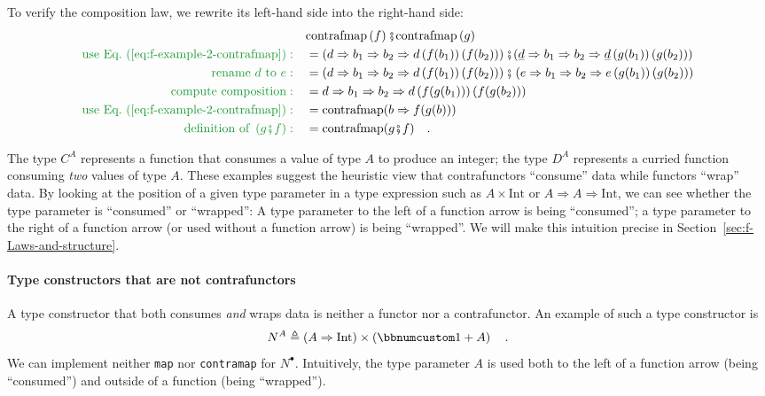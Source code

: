 To verify the composition law, we rewrite its left-hand side into
the right-hand side:
\begin{align*}
 & \text{contrafmap}\left(f\right)\bef\text{contrafmap}\left(g\right)\\
{\color{greenunder}\text{use Eq.~(\ref{eq:f-example-2-contrafmap})}:}\quad & =\left(d\Rightarrow b_{1}\Rightarrow b_{2}\Rightarrow d\left(f(b_{1})\right)\left(f(b_{2})\right)\right)\bef(\gunderline d\Rightarrow b_{1}\Rightarrow b_{2}\Rightarrow\gunderline d\left(g(b_{1})\right)\left(g(b_{2})\right))\\
{\color{greenunder}\text{rename }d\text{ to }e:}\quad & =\left(d\Rightarrow b_{1}\Rightarrow b_{2}\Rightarrow d\left(f(b_{1})\right)\left(f(b_{2})\right)\right)\bef\left(e\Rightarrow b_{1}\Rightarrow b_{2}\Rightarrow e\left(g(b_{1})\right)\left(g(b_{2})\right)\right)\\
{\color{greenunder}\text{compute composition}:}\quad & =d\Rightarrow b_{1}\Rightarrow b_{2}\Rightarrow d\left(f(g(b_{1}))\right)\left(f(g(b_{2}))\right)\\
{\color{greenunder}\text{use Eq.~(\ref{eq:f-example-2-contrafmap})}:}\quad & =\text{contrafmap}(b\Rightarrow f(g(b)))\\
{\color{greenunder}\text{definition of }\left(g\bef f\right):}\quad & =\text{contrafmap}(g\bef f)\quad.
\end{align*}

The type $C^{A}$ represents a function that consumes a value of type
$A$ to produce an integer; the type $D^{A}$ represents a curried
function consuming \emph{two} values of type $A$. These examples
suggest the heuristic view that contrafunctors ``consume'' data
while functors ``wrap'' data. By looking at the position of a given
type parameter in a type expression such as $A\times\text{Int}$ or
$A\Rightarrow A\Rightarrow\text{Int}$, we can see whether the type
parameter is ``consumed'' or ``wrapped'': A type parameter to
the left of a function arrow is being ``consumed''; a type parameter
to the right of a function arrow (or used without a function arrow)
is being ``wrapped''. We will make this intuition precise in Section~\ref{sec:f-Laws-and-structure}.

\paragraph{Type constructors that are not contrafunctors }

A type constructor that both consumes \emph{and} wraps data is neither
a functor nor a contrafunctor. An example of such a type constructor
is
\[
N^{A}\triangleq\left(A\Rightarrow\text{Int}\right)\times\left(\bbnum 1+A\right)\quad.
\]
We can implement neither \lstinline!map! nor \lstinline!contramap!
for $N^{\bullet}$. Intuitively, the type parameter $A$ is used both
to the left of a function arrow (being ``consumed'') and outside
of a function (being ``wrapped'').

